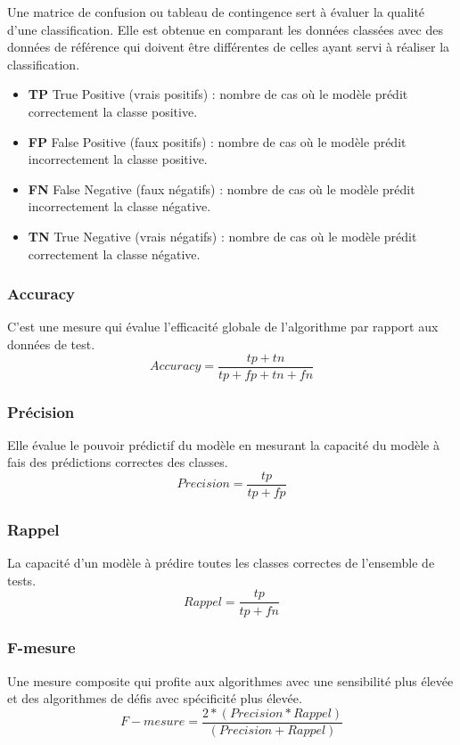         Une matrice de confusion ou tableau de contingence sert à évaluer la qualité d'une classification. Elle est obtenue en comparant les données classées avec des données de référence qui doivent être différentes de celles ayant servi à réaliser la classification.
        
        \begin{itemize}
            \item{\textbf{TP }True Positive (vrais positifs) :} nombre de cas où le modèle prédit correctement la classe positive.
            \item{\textbf{FP }False Positive (faux positifs) :} nombre de cas où le modèle prédit incorrectement la classe positive.
            \item{\textbf{FN }False Negative (faux négatifs) :} nombre de cas où le modèle prédit incorrectement la classe négative.
            \item{\textbf{TN }True Negative (vrais négatifs) :} nombre de cas où le modèle prédit correctement la classe négative.
        \end{itemize}
        
        \subsubsection{Accuracy} 
        C'est une mesure qui évalue l'efficacité globale de l'algorithme par rapport aux données de test.
        \[ Accuracy = \frac{tp+tn} {tp+fp+tn+fn} \]
        \subsubsection{Précision} 
        Elle évalue le pouvoir prédictif du modèle en mesurant la capacité du modèle à fais des prédictions correctes des classes.
        \[ Precision = \frac{tp} {tp+fp} \]
        \subsubsection{Rappel} 
        La capacité d’un modèle à prédire toutes les classes correctes de l'ensemble de tests.
        \[ Rappel = \frac{tp} {tp+fn} \]
        \subsubsection{F-mesure}
        Une mesure composite qui profite aux algorithmes avec une sensibilité plus élevée et des algorithmes de défis avec spécificité plus élevée. \label{fmesure}
        \[ F-mesure = \frac{2 * (Precision * Rappel)} {(Precision + Rappel)}\]
        
